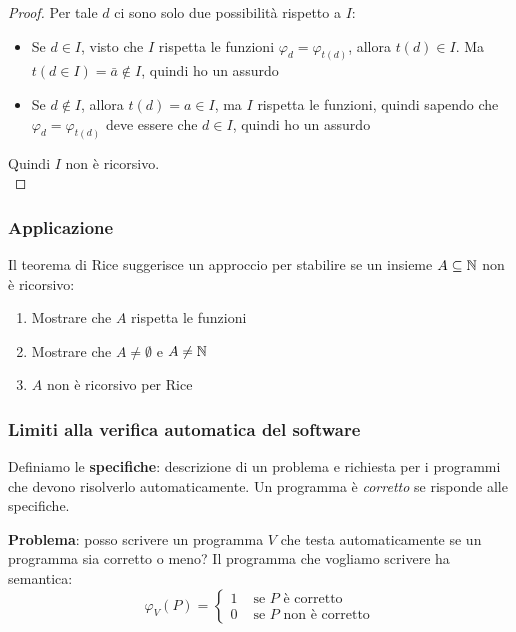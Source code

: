\begin{proof}
	Per tale $d$ ci sono solo due possibilità rispetto a $I$:
	\begin{itemize}
		\item Se $d \in I$, visto che $I$ rispetta le funzioni $\varphi_d = \varphi_{t(d)}$, allora $t(d) \in I$. Ma $t(d \in I) = \bar{a} \notin I$, quindi ho un assurdo
		
        \item Se $d \notin I$, allora $t(d) = a \in I$, ma $I$ rispetta le funzioni, quindi sapendo che $\varphi_d = \varphi_{t(d)}$ deve essere che $d \in I$, quindi ho un assurdo
	\end{itemize}
	Quindi $I$ non è ricorsivo.\\
  \end{proof}

\subsubsection{Applicazione}

Il teorema di Rice suggerisce un approccio per stabilire se un insieme $A \subseteq \mathbb{N}$ non è ricorsivo:
\begin{enumerate}
	\item Mostrare che $A$ rispetta le funzioni
	
    \item Mostrare che $A \neq \emptyset$ e $A \neq \mathbb{N}$
	
    \item $A$ non è ricorsivo per Rice
\end{enumerate}

\subsubsection{Limiti alla verifica automatica del software}

Definiamo le \textbf{specifiche}: descrizione di un problema e richiesta per i programmi che devono risolverlo automaticamente. Un programma è \textit{corretto} se risponde alle specifiche.

\textbf{Problema}: posso scrivere un programma $V$ che testa automaticamente se un programma sia corretto o meno? Il programma che vogliamo scrivere ha semantica:
$$
\varphi_V (P) = \begin{cases}
	1 & \text{ se } P \text{ è corretto} \\
	0 & \text{ se } P \text{ non è corretto}
\end{cases}
$$

